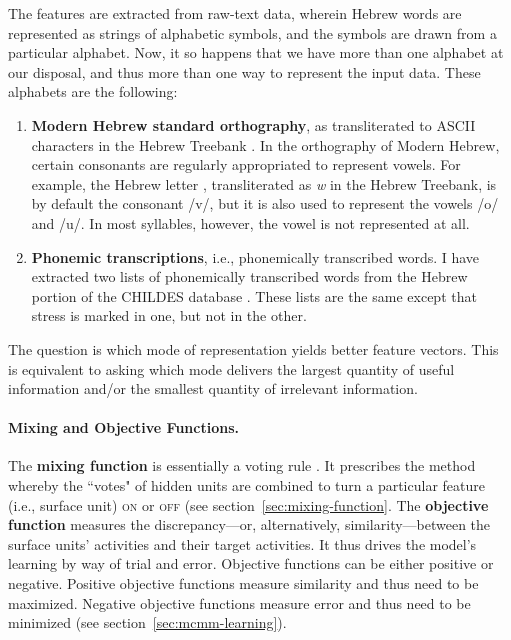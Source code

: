 The features are extracted from raw-text data, wherein Hebrew words are represented as strings of alphabetic symbols, and the symbols are drawn from a particular alphabet. Now, it so happens that we have more than one alphabet at our disposal, and thus more than one way to represent the input data. These alphabets are the following:
	\begin{enumerate}
		\item \textbf{Modern Hebrew standard orthography}, as transliterated to ASCII characters in the Hebrew Treebank \citep{simaan-et-al:2001}. In the orthography of Modern Hebrew, certain consonants are regularly appropriated to represent vowels. For example, the Hebrew letter
		, transliterated as \textit{w} in the Hebrew Treebank, is by default the consonant /v/, but it is also used to represent the vowels /o/ and /u/. In most syllables, however, the vowel is not represented at all. 
		\item \textbf{Phonemic transcriptions}, i.e., phonemically transcribed words. I have extracted two lists of phonemically transcribed words from the Hebrew portion of the CHILDES database \citep{macwhinney:2000a}. 
		 These lists are the same except that stress is marked in one, but not in the other.
	\end{enumerate}
	The question is which mode of representation yields better feature vectors. This is equivalent to asking which mode delivers the largest quantity of useful information and/or the smallest quantity of irrelevant information.
	\paragraph{Mixing and Objective Functions.} The \textbf{mixing function} 
is essentially a voting rule \citep{saund:94}. It prescribes the method whereby the 
``votes" of  hidden units are combined to turn a particular feature (i.e., surface unit) \textsc{on} or \textsc{off} (see section~\ref{sec:mixing-function}. The \textbf{objective function} measures the discrepancy---or, alternatively, similarity---between the surface units' activities and their target activities. 
It thus drives the model's learning by way of trial and error. Objective functions can 
be either positive or negative. Positive objective functions measure similarity and thus 
need to be maximized. Negative objective functions measure error and thus need to be minimized (see section~\ref{sec:mcmm-learning}).

